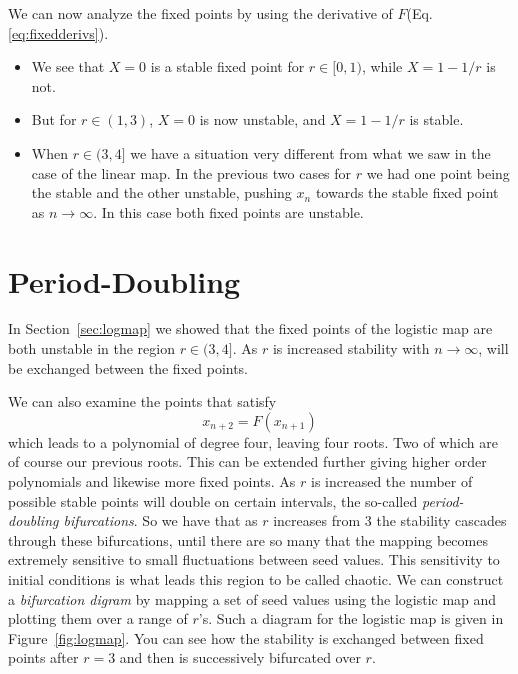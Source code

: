 \documentclass[paper=a4, fontsize=11pt, abstract=on]{scrartcl} %
\numberwithin{equation}{section}
\numberwithin{figure}{section}
\numberwithin{table}{section}
\begin{document}
We can now analyze the fixed points by using the derivative of
$F$(Eq.\ref{eq:fixedderivs}).
\begin{itemize}
\item We see that $X=0$ is a stable fixed point for $r\in [0,1)$, while
$X=1-1/r$ is not. 
\item But for $r\in (1,3)$, $X=0$ is now unstable, and $X=1-1/r$ is
  stable.
\item When $r\in (3,4]$ we have a situation very different from what
  we saw in the case of the linear map. In the previous two cases for
  $r$ we had one point being the stable and the other unstable,
  pushing $x_n$ towards the stable fixed point as $n\rightarrow
  \infty$. In this case both fixed points are unstable.
\end{itemize}

\section{Period-Doubling}
\label{sec:pdub}

In Section~\ref{sec:logmap} we showed that the fixed points of the
logistic map are both unstable in the region $r \in (3, 4]$. As $r$ is
increased stability with $n \rightarrow \infty$, will be exchanged
between the fixed points. 

\vline

We can also examine the points that satisfy
\begin{equation}
  \label{eq:doubling}
  x_{n+2} = F(x_{n+1})
\end{equation}
which leads to a polynomial of degree four, leaving four roots. Two of
which are of course our previous roots. This can be extended further
giving higher order polynomials and likewise more fixed points. As $r$
is increased the number of possible stable points will double on
certain intervals, the so-called \emph{period-doubling
  bifurcations}. So we have that as $r$ increases from 3 the stability
cascades through these bifurcations, until there are so many that the
mapping becomes extremely sensitive to small fluctuations between seed
values. This sensitivity to initial conditions is what leads this
region to be called chaotic. We can construct a \emph{bifurcation digram} by mapping a set
of seed values using the logistic map and plotting them over a range
of $r$'s. Such a diagram for the logistic map is given in
Figure~\ref{fig:logmap}. You can see how the stability is exchanged
between fixed points after $r=3$ and then is successively bifurcated
over $r$. 
\end{document}
